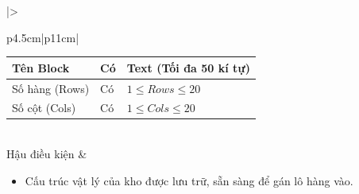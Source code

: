 \documentclass[12pt,a4paper]{report}
\begin{document}
\begin{longtable}{|>{\raggedright\arraybackslash\bfseries}p{4.5cm}|p{11cm}|}
\begin{tabular}{|p{3.5cm}|p{2.5cm}|p{4cm}|}
Tên Block & Có & Text (Tối đa 50 kí tự) \\ \hline
Số hàng (Rows) & Có & $1 \le Rows \le 20$ \\ \hline
Số cột (Cols) & Có & $1 \le Cols \le 20$ \\ \hline
\end{tabular} \\ \hline
Hậu điều kiện & 
\begin{itemize}[leftmargin=*, nosep, topsep=0pt, partopsep=0pt]
    \item Cấu trúc vật lý của kho được lưu trữ, sẵn sàng để gán lô hàng vào.
\end{itemize} \\ \hline
\end{longtable}

\vspace{0.5cm}
\end{document}
